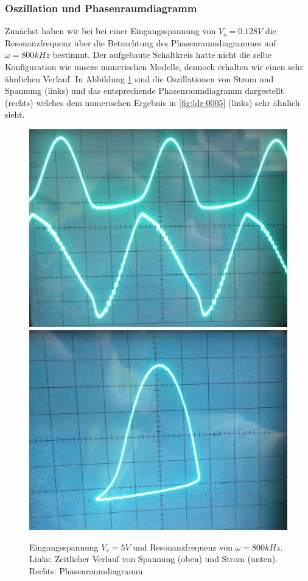 \documentclass[12pt,a4paper]{article}
\begin{document}
\subsubsection { Oszillation und Phasenraumdiagramm }
Zunächst haben wir bei bei einer Eingangsspannung von $V_s=0.128V$ die Resonanzfrequenz über die Betrachtung des Phasenraumdiagrammes auf $\omega=800kHz$ bestimmt. 
Der aufgebaute Schaltkreis hatte nicht die selbe Konfiguration wie unsere numerischen Modelle, dennoch erhalten wir einen sehr ähnlichen Verlauf. In Abbildung \ref{fig:ldr-real1} sind die Oszillationen von Strom und Spannung (links) und das entsprechende Phasenraumdiagramm dargestellt (rechts) welches dem numerischen Ergebnis in \ref{fig:ldr-0005} (links) sehr ähnlich sieht. 
\begin{figure}[!htbp]
\centering
\includegraphics[scale=0.1]{800khz-5V-oszi}
\includegraphics[scale=0.11]{800khz-5V-phase}
\caption{Eingangsspannung $V_s=5V$ und Resonanzfrequenz von $\omega=800kHz$. Links: Zeitlicher Verlauf von Spannung (oben) und Strom (unten). Rechts: Phasenraumdiagramm}
\label{fig:ldr-real1}
\end{figure}
\end{document}
